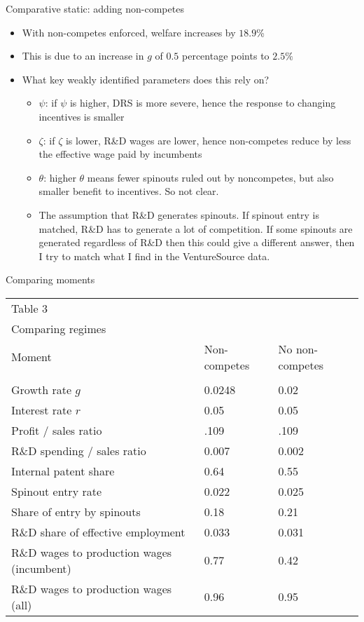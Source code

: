 \documentclass[english,usenames,dvipsnames]{beamer}
\begin{document}
\begin{frame}{Comparative static: adding non-competes}
\begin{itemize}
	\item With non-competes enforced, welfare increases by $18.9$\%
	\item This is due to an increase in $g$ of $0.5$ percentage points to $2.5\%$
	\item What key weakly identified parameters does this rely on?
	\begin{itemize}
		\item $\psi$: if $\psi$ is higher, DRS is more severe, hence the response to changing incentives is smaller
		\item $\zeta$: if $\zeta$ is lower, R\&D wages are lower, hence non-competes reduce by less the effective wage paid by incumbents
		\item $\theta$: higher $\theta$ means fewer spinouts ruled out by noncompetes, but also smaller benefit to incentives. So not clear. 
		\item The assumption that R\&D generates spinouts. If spinout entry is matched, R\&D has to generate a lot of competition. If some spinouts are generated regardless of R\&D then this could give a different answer, then I try to match what I find in the VentureSource data.
	\end{itemize}
\end{itemize}
\end{frame}

\begin{frame}{Comparing moments}
\begin{table}[H]
	\scriptsize
	\centering{}%
	\begin{tabular}{lll}
		Table 3 &  &  \tabularnewline
		Comparing regimes &  &  \tabularnewline
		\hline 
		Moment  & Non-competes & No non-competes\tabularnewline
		&   & \tabularnewline
		\hline 
		Growth rate $g$ & 0.0248 & 0.02 \tabularnewline
		Interest rate $r$ & 0.05 & 0.05 \tabularnewline
		Profit / sales ratio & .109 & .109 \tabularnewline
		R\&D spending / sales ratio & 0.007 & 0.002 \tabularnewline
		Internal patent share & 0.64 & 0.55 \tabularnewline
		Spinout entry rate & 0.022 & 0.025 \tabularnewline
		Share of entry by spinouts & 0.18 & 0.21 \tabularnewline
		R\&D share of effective employment & 0.033 & 0.031 \tabularnewline
		R\&D wages to production wages (incumbent) & 0.77 & 0.42 \tabularnewline
		R\&D wages to production wages (all) & 0.96 & 0.95
	\end{tabular}
\end{table}
\end{frame}
\end{document}

